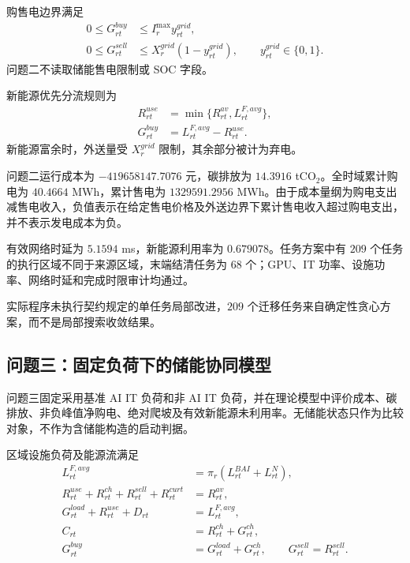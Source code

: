 购售电边界满足
\begin{align}
0\le G_{rt}^{buy}&\le I_r^{\max}y_{rt}^{grid},\\
0\le G_{rt}^{sell}&\le X_r^{grid}(1-y_{rt}^{grid}),
\qquad y_{rt}^{grid}\in\{0,1\}.
\end{align}
问题二不读取储能售电限制或 SOC 字段。

新能源优先分流规则为
\begin{align}
R_{rt}^{use}&=\min\{R_{rt}^{av},L_{rt}^{F,avg}\},\\
G_{rt}^{buy}&=L_{rt}^{F,avg}-R_{rt}^{use}.
\end{align}
新能源富余时，外送量受 $X_r^{grid}$ 限制，其余部分被计为弃电。

问题二运行成本为 $-419658147.7076$ 元，碳排放为 $14.3916$ tCO$_2$。全时域累计购电为 $40.4664$ MWh，累计售电为 $1329591.2956$ MWh。由于成本量纲为购电支出减售电收入，负值表示在给定售电价格及外送边界下累计售电收入超过购电支出，并不表示发电成本为负。

有效网络时延为 $5.1594$ ms，新能源利用率为 $0.679078$。任务方案中有 $209$ 个任务的执行区域不同于来源区域，末端结清任务为 $68$ 个；GPU、IT 功率、设施功率、网络时延和完成时限审计均通过。

实际程序未执行契约规定的单任务局部改进，$209$ 个迁移任务来自确定性贪心方案，而不是局部搜索收敛结果。

\subsection{问题三：固定负荷下的储能协同模型}

问题三固定采用基准 AI IT 负荷和非 AI IT 负荷，并在理论模型中评价成本、碳排放、非负峰值净购电、绝对爬坡及有效新能源未利用率。无储能状态只作为比较对象，不作为含储能构造的启动判据。

区域设施负荷及能源流满足
\begin{align}
L_{rt}^{F,avg}&=\pi_r(L_{rt}^{BAI}+L_{rt}^{N}),\\
R_{rt}^{use}+R_{rt}^{ch}+R_{rt}^{sell}+R_{rt}^{curt}&=R_{rt}^{av},\\
G_{rt}^{load}+R_{rt}^{use}+D_{rt}&=L_{rt}^{F,avg},\\
C_{rt}&=R_{rt}^{ch}+G_{rt}^{ch},\\
G_{rt}^{buy}&=G_{rt}^{load}+G_{rt}^{ch},\qquad
G_{rt}^{sell}=R_{rt}^{sell}.
\end{align}

